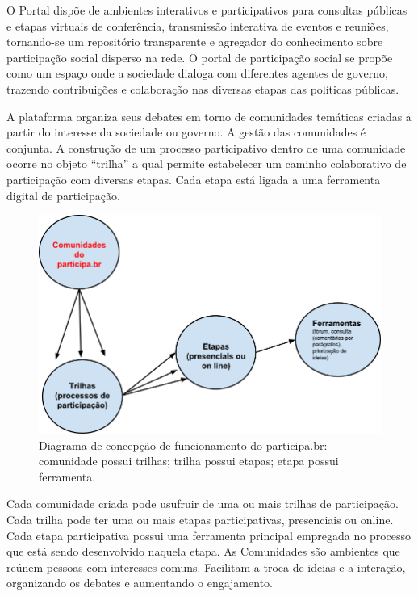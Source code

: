 \documentclass{article}
\begin{document}
O Portal dispõe de ambientes interativos e participativos para consultas
públicas e etapas virtuais de conferência, transmissão interativa de eventos e
reuniões, tornando-se um repositório transparente e agregador do conhecimento
sobre participação social disperso na rede. O portal de participação social se
propõe como um espaço onde a sociedade dialoga com diferentes agentes de
governo, trazendo contribuições e colaboração nas diversas etapas das políticas
públicas.

A plataforma organiza seus debates em torno de comunidades temáticas criadas a
partir do interesse da sociedade ou governo. A gestão das comunidades é
conjunta. A construção de um processo participativo dentro de uma comunidade
ocorre no objeto ``trilha'' a qual permite estabelecer um caminho colaborativo de
participação com diversas etapas. Cada etapa está ligada a uma ferramenta
digital de participação.  

\begin{figure}[h]
  \center
  \includegraphics[scale=0.6]{imagens/diagrama-funcionamento.png}
  \caption{Diagrama de concepção de funcionamento do participa.br: comunidade possui trilhas; trilha possui etapas; etapa possui ferramenta.}
  \label{diagrama-funcionamento}
\end{figure}

Cada comunidade criada pode usufruir de uma ou mais trilhas de participação.
Cada trilha pode ter uma ou mais etapas participativas, presenciais ou online.
Cada etapa participativa possui uma ferramenta principal empregada no processo
que está sendo desenvolvido naquela etapa. As Comunidades são ambientes que
reúnem pessoas com interesses comuns. Facilitam a troca de ideias e a
interação, organizando os debates e aumentando o engajamento. 
\end{document}
